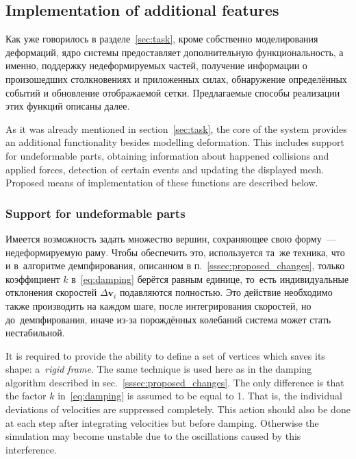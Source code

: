 \documentclass[a4paper, 12pt, titlepage]{extarticle}
\newcommand{\vect}[1]{\mathbf{#1}} %
\begin{document}
    \subsection{Implementation of additional features}

\begin{original}
      Как уже говорилось в разделе~\ref{sec:task}, кроме собственно моделирования деформаций, ядро
      системы предоставляет дополнительную функциональность, а именно, поддержку недеформируемых
      частей, получение информации о произошедших столкновениях и приложенных силах, обнаружение
      определённых событий и обновление отображаемой сетки. Предлагаемые способы
      реализации этих функций описаны далее.
\end{original}

      As it was already mentioned in section~\ref{sec:task}, the core of the system provides
      an additional functionality besides modelling deformation. This includes support for
      undeformable parts, obtaining information about happened collisions and applied forces,
      detection of certain events and updating the displayed mesh. Proposed means of implementation
      of these functions are described below.

      \subsubsection{Support for undeformable parts}

\begin{original}
        Имеется возможность задать множество вершин, сохраняющее свою форму~--- недеформируемую раму.
        Чтобы обеспечить это, используется та~же техника, что и в~алгоритме демпфирования,
        описанном в п.~\ref{sssec:proposed_changes}, только коэффициент $k$ в~\eqref{eq:damping}
        берётся равным единице, то~есть индивидуальные отклонения скоростей $\Delta \vect{v}_i$
        подавляются полностью. Это действие необходимо также производить на каждом шаге, после
        интегрирования скоростей, но до~демпфирования, иначе из-за порождённых колебаний система
        может стать нестабильной.
\end{original}

        It is required to provide the ability to define a set of vertices which saves its shape:
        a~\emph{rigid frame}. The same technique is used here as in the damping algorithm described
        in sec.~\ref{sssec:proposed_changes}. The only difference is that the factor $k$
        in~\eqref{eq:damping} is assumed to be equal to 1. That is, the individual deviations of
        velocities are suppressed completely. This action should also be done at each step after
        integrating velocities but before damping. Otherwise the simulation may become unstable due
        to the oscillations caused by this interference.
\end{document}
